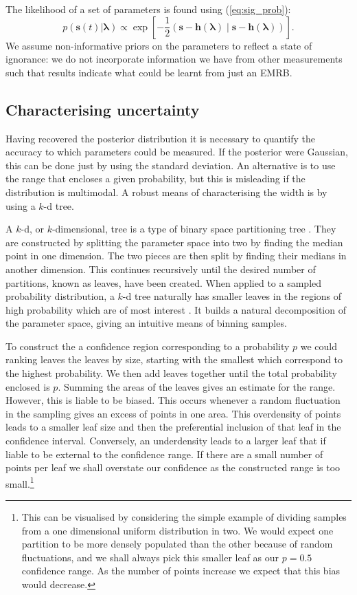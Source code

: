 \documentclass[useAMS,usedcolumn,usegraphicx,usenatbib]{mn2e}
\newcommand{\eqnref}[1]{(\ref{eq:#1})}
\newcommand{\recip}[1]{\ensuremath{\frac{1}{#1}}}
\newcommand{\innerprod}[2]{\ensuremath{\left({#1}\middle|{#2}\right)}}
\begin{document}
The likelihood of a set of parameters is found using \eqnref{sig_prob}:
\begin{equation}
p(\boldsymbol{s}(t)|\boldsymbol{\lambda}) \propto \exp\left[-\recip{2}\innerprod{\boldsymbol{s}-\boldsymbol{h}(\boldsymbol{\lambda})}{\boldsymbol{s}-\boldsymbol{h}(\boldsymbol{\lambda})}\right].
\label{eq:likelihood}
\end{equation}
We assume non-informative priors on the parameters to reflect a state of ignorance: we do not incorporate information we have from other measurements such that results indicate what could be learnt from just an EMRB.

\subsection{Characterising uncertainty}

Having recovered the posterior distribution it is necessary to quantify the accuracy to which parameters could be measured. If the posterior were Gaussian, this can be done just by using the standard deviation. An alternative is to use the range that encloses a given probability, but this is misleading if the distribution is multimodal. A robust means of characterising the width is by using a $k$-d tree.

A $k$-d, or $k$-dimensional, tree is a type of binary space partitioning tree \citep[sections 5.2, 12.1, 12.3]{Berg2008}. They are constructed by splitting the parameter space into two by finding the median point in one dimension. The two pieces are then split by finding their medians in another dimension. This continues recursively until the desired number of partitions, known as leaves, have been created. When applied to a sampled probability distribution, a $k$-d tree naturally has smaller leaves in the regions of high probability which are of most interest \citep{Weinberg2012}. It builds a natural decomposition of the parameter space, giving an intuitive means of binning samples.

To construct the a confidence region corresponding to a probability $p$ we could ranking leaves the leaves by size, starting with the smallest which correspond to the highest probability. We then add leaves together until the total probability enclosed is $p$. Summing the areas of the leaves gives an estimate for the range. However, this is liable to be biased. This occurs whenever a random fluctuation in the sampling gives an excess of points in one area. This overdensity of points leads to a smaller leaf size and then the preferential inclusion of that leaf in the confidence interval. Conversely, an underdensity leads to a larger leaf that if liable to be external to the confidence range. If there are a small number of points per leaf we shall overstate our confidence as the constructed range is too small.\footnote{This can be visualised by considering the simple example of dividing samples from a one dimensional uniform distribution in two. We would expect one partition to be more densely populated than the other because of random fluctuations, and we shall always pick this smaller leaf as our $p = 0.5$ confidence range. As the number of points increase we expect that this bias would decrease.}
\end{document}
